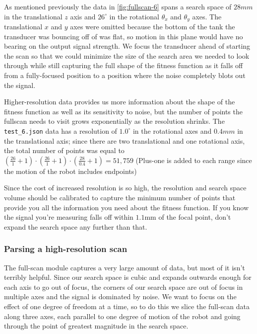 \documentclass[11pt]{article}
\begin{document}
As mentioned previously the data in \autoref{fig:fullscan-6} spans a search space of $28 mm$ in the translational $z$ axis and $26^\circ$ in the rotational $\theta_x$ and $\theta_y$ axes. The translational $x$ and $y$ axes were omitted because the bottom of the tank the transducer was bouncing off of was flat, so motion in this plane would have no bearing on the output signal strength.
We focus the transducer ahead of starting the scan so that we could minimize the size of the search area we needed to look through while still capturing the full shape of the fitness function as it falls off from a fully-focused position to a position where the noise completely blots out the signal.

Higher-resolution data provides us more information about the shape of the fitness function as well as its sensitivity to noise, but the number of points the fullscan needs to visit grows exponentially as the resolution shrinks.
The \texttt{test\_6.json} data has a resolution of $1.0^\circ$ in the rotational axes and $0.4 mm$ in the translational axis; since there are two translational and one rotational axis, the total number of points was equal to $\left(\frac{26}{1} + 1\right) \cdot \left(\frac{26}{1} + 1\right) \cdot \left(\frac{28}{0.4} + 1\right) = 51,759$ (Plus-one is added to each range since the motion of the robot includes endpoints)

Since the cost of increased resolution is so high, the resolution and search space volume should be calibrated to capture the minimum number of points that provide you all the information you need about the fitness function. If you know the signal you're measuring falls off within $1.1\textrm{mm}$ of the focal point, don't expand the search space any further than that.

\subsubsection{Parsing a high-resolution scan}
The full-scan module captures a very large amount of data, but most of it isn't terribly helpful. Since our search space is cubic and expands outwards enough for each axis to go out of focus, the corners of our search space are out of focus in multiple axes and the signal is dominated by noise.
We want to focus on the effect of one degree of freedom at a time, so to do this we slice the full-scan data along three axes, each parallel to one degree of motion of the robot and going through the point of greatest magnitude in the search space.
\end{document}
